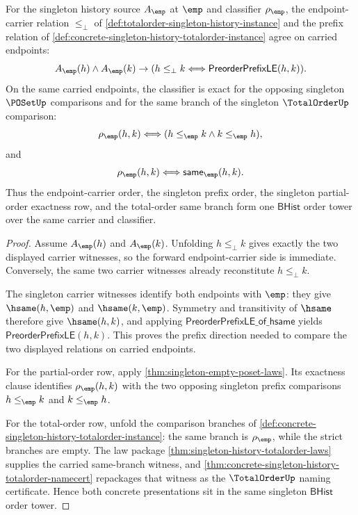 \begin{theorem}
\label{thm:totalorder-singleton-order-tower-certificate}
For the singleton history source $A_{\emp}$ at $\emp$ and classifier
$\rho_{\emp}$, the endpoint-carrier relation
$\le_{\bot}$ of \autoref{def:totalorder-singleton-history-instance} and the
prefix relation of
\autoref{def:concrete-singleton-history-totalorder-instance} agree on carried
endpoints:
$$
A_{\emp}(h)\land A_{\emp}(k)\to
(h\le_{\bot}k\Longleftrightarrow \mathsf{PreorderPrefixLE}(h,k)).
$$
On the same carried endpoints, the classifier is exact for the opposing
singleton $\POSetUp$ comparisons and for the same branch of the singleton
$\TotalOrderUp$ comparison:
$$
\rho_{\emp}(h,k)\Longleftrightarrow
(h\le_{\emp}k\land k\le_{\emp}h),
$$
and
$$
\rho_{\emp}(h,k)\Longleftrightarrow \mathsf{same}_{\emp}(h,k).
$$
Thus the endpoint-carrier order, the singleton prefix order, the singleton
partial-order exactness row, and the total-order same branch form one
$\mathsf{BHist}$ order tower over the same carrier and classifier.
\end{theorem}
\begin{proof}
Assume $A_{\emp}(h)$ and $A_{\emp}(k)$. Unfolding $h\le_{\bot}k$ gives exactly
the two displayed carrier witnesses, so the forward endpoint-carrier side is
immediate. Conversely, the same two carrier witnesses already reconstitute
$h\le_{\bot}k$.

The singleton carrier witnesses identify both endpoints with $\emp$: they give
$\hsame(h,\emp)$ and $\hsame(k,\emp)$. Symmetry and transitivity of $\hsame$
therefore give $\hsame(h,k)$, and applying
$\mathsf{PreorderPrefixLE\_of\_hsame}$ yields
$\mathsf{PreorderPrefixLE}(h,k)$. This proves the prefix direction needed to
compare the two displayed relations on carried endpoints.

For the partial-order row, apply
\autoref{thm:singleton-empty-poset-laws}. Its exactness clause identifies
$\rho_{\emp}(h,k)$ with the two opposing singleton prefix comparisons
$h\le_{\emp}k$ and $k\le_{\emp}h$.

For the total-order row, unfold the comparison branches of
\autoref{def:concrete-singleton-history-totalorder-instance}: the same branch
is $\rho_{\emp}$, while the strict branches are empty. The law package
\autoref{thm:singleton-history-totalorder-laws} supplies the carried
same-branch witness, and
\autoref{thm:concrete-singleton-history-totalorder-namecert} repackages that
witness as the $\TotalOrderUp$ naming certificate. Hence both concrete
presentations sit in the same singleton $\mathsf{BHist}$ order tower.
\end{proof}

